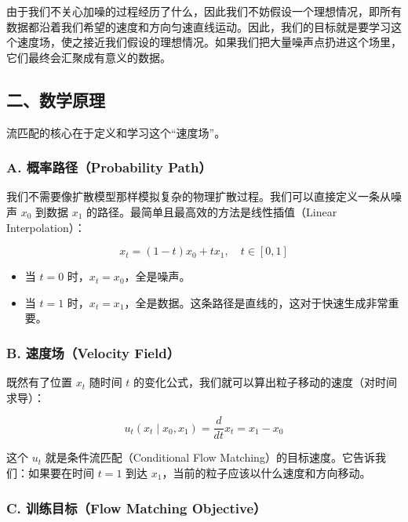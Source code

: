 由于我们不关心加噪的过程经历了什么，因此我们不妨假设一个理想情况，即所有数据都沿着我们希望的速度和方向匀速直线运动。因此，我们的目标就是要学习这个速度场，使之接近我们假设的理想情况。如果我们把大量噪声点扔进这个场里，它们最终会汇聚成有意义的数据。

\hypertarget{ux4e8cux6570ux5b66ux539fux7406}{%
\subsection{二、数学原理}\label{ux4e8cux6570ux5b66ux539fux7406}}

流匹配的核心在于定义和学习这个``速度场''。

\hypertarget{a.-ux6982ux7387ux8defux5f84probability-path}{%
\subsubsection{A. 概率路径（Probability Path）}\label{a.-ux6982ux7387ux8defux5f84probability-path}}

我们不需要像扩散模型那样模拟复杂的物理扩散过程。我们可以直接定义一条从噪声 \(x_0\) 到数据 \(x_1\) 的路径。最简单且最高效的方法是线性插值（Linear Interpolation）：

\[
x_t=(1-t)x_0+tx_1,\quad t\in[0,1]
\]

\begin{itemize}
\tightlist
\item
  当 \(t=0\) 时，\(x_t=x_0\)，全是噪声。
\item
  当 \(t=1\) 时，\(x_t=x_1\)，全是数据。这条路径是直线的，这对于快速生成非常重要。
\end{itemize}

\hypertarget{b.-ux901fux5ea6ux573avelocity-field}{%
\subsubsection{B. 速度场（Velocity Field）}\label{b.-ux901fux5ea6ux573avelocity-field}}

既然有了位置 \(x_t\) 随时间 \(t\) 的变化公式，我们就可以算出粒子移动的速度（对时间求导）：

\[
u_t(x_t\mid x_0,x_1)=\frac{d}{dt}x_t=x_1-x_0
\]

这个 \(u_t\) 就是条件流匹配（Conditional Flow Matching）的目标速度。它告诉我们：如果要在时间 \(t=1\) 到达 \(x_1\)，当前的粒子应该以什么速度和方向移动。

\hypertarget{c.-ux8badux7ec3ux76eeux6807flow-matching-objective}{%
\subsubsection{C. 训练目标（Flow Matching Objective）}\label{c.-ux8badux7ec3ux76eeux6807flow-matching-objective}}

